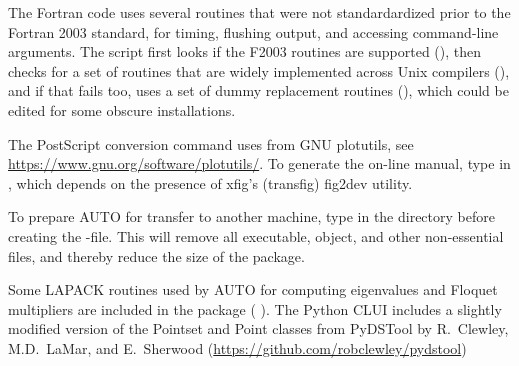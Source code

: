 \documentclass[12pt]{report}
\begin{document}
The Fortran code uses several routines that were not standardardized
prior to the Fortran 2003 standard, for timing, flushing output, and
accessing command-line arguments. The  script first looks if
the F2003 routines are supported (), then checks
for a set of routines that are widely implemented across Unix
compilers (), and if that fails too, uses a set of
dummy replacement routines (), which could be
edited for some obscure installations.

The PostScript conversion command  uses
 from GNU plotutils,
see \url{https://www.gnu.org/software/plotutils/}.
To generate the on-line manual, type  in
, which depends on the presence of xfig's
(transfig) fig2dev utility.

To prepare {\cal AUTO} for transfer to another machine,
type 
in the directory  before creating the -file. 
This will remove all executable, object, and other non-essential files, and
thereby reduce the size of the package.

Some {\cal LAPACK} routines used by {\cal AUTO} for computing eigenvalues and
Floquet multipliers are included in the package
( \citeyear{LAPACK:99}).
The Python CLUI includes a slightly modified version of the Pointset
and Point classes from PyDSTool by R.~Clewley, M.D.~LaMar, and E.~Sherwood
(\url{https://github.com/robclewley/pydstool})
\end{document}
